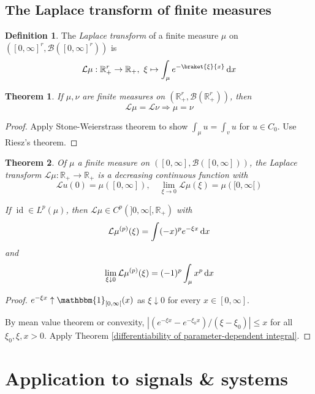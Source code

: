 \documentclass[11pt, a4paper, openany]{book}
\newtheorem{thm}{Theorem}\newtheorem{lem}{Lemma}\newtheorem{crl}{Corollary}
\theoremstyle{definition}
\newtheorem{define}{Definition}\newtheorem{exam}{Example}\newtheorem{remark}{Remark}
\DeclareMathOperator{\id}{id}
\begin{document}
\subsection{The Laplace transform of finite measures}
    \begin{define}
        The \textit{Laplace transform} of a finite measure $\mu$ on $([0,\infty]^r,\mathscr{B}([0,\infty]^r))$ is
        \[
            \mathcal{L}\mu:\mathbb{R}_+^r\rightarrow \mathbb{R}_+,\,\,\xi\mapsto \int_\mu e^{-\braket{\xi}{x}}\odif x
        \]
    \end{define}
    \begin{thm}
        If $\mu,\nu$ are finite measures on $(\mathbb{R}^r_+,\mathscr{B}(\mathbb{R}^r_+))$, then 
        \[
            \mathcal{L}\mu=\mathcal{L}\nu\Longrightarrow \mu=\nu
        \]
    \end{thm}
    \begin{proof}
        Apply Stone-Weierstrass theorem to show $\int_\mu u=\int_v u$ for $u\in C_0$. Use Riesz's theorem.
    \end{proof}
    \begin{thm}
        Of $\mu$ a finite measure on $([0,\infty],\mathscr{B}([0,\infty]))$, the Laplace transform $\mathcal{L}\mu:\mathbb{R}_+\rightarrow \mathbb{R}_+$ is a decreasing continuous function with
        \[
            \mathcal{L}u(0)=\mu([0,\infty]),\quad\lim_{\xi\to 0}\mathcal{L}\mu(\xi)=\mu([0,\infty[)
        \]

        If $\id \in L^p(\mu)$, then $\mathcal{L}\mu\in C^p(]0,\infty[,\mathbb{R}_+)$ with
        \[
            \mathcal{L}\mu^{(p)}(\xi)=\int (-x)^p e^{-\xi x}\odif x
        \]
        and
        \[
            \lim_{\xi\downarrow 0}\mathcal{L}\mu^{(p)}(\xi)=(-1)^p\int_\mu x^p \odif x
        \]
    \end{thm}
    \begin{proof}
        $e^{-\xi x}\uparrow \mathbbm{1}_{[0,\infty[}(x)$ as $\xi\downarrow 0$ for every $x\in [0,\infty]$.

        By mean value theorem or convexity, $|(e^{-\xi x}-e^{-\xi_0 x})/(\xi-\xi_0)|\leqslant x $ for all $\xi_0,\xi,x>0$. Apply Theorem \ref{differentiability of parameter-dependent integral}.
    \end{proof}
\section{Application to signals \& systems}
\end{document}
